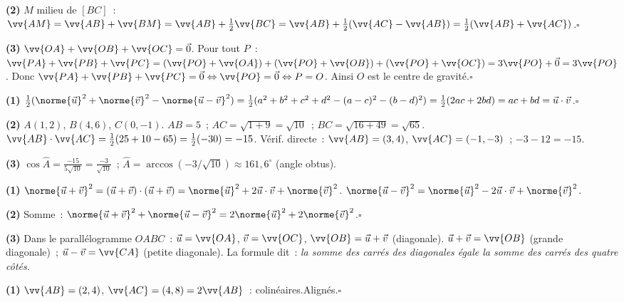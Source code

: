 \textbf{(2)} $M$ milieu de $[BC]$~: $\vv{AM}=\vv{AB}+\vv{BM}=\vv{AB}+\frac{1}{2}\vv{BC}
=\vv{AB}+\frac{1}{2}(\vv{AC}-\vv{AB})=\frac{1}{2}(\vv{AB}+\vv{AC})$.\hfill$\square$

\textbf{(3)} $\vv{OA}+\vv{OB}+\vv{OC}=\vec{0}$. Pour tout $P$~:
$\vv{PA}+\vv{PB}+\vv{PC}=(\vv{PO}+\vv{OA})+(\vv{PO}+\vv{OB})+(\vv{PO}+\vv{OC})
=3\vv{PO}+\vec{0}=3\vv{PO}$.
Donc $\vv{PA}+\vv{PB}+\vv{PC}=\vec{0}\Leftrightarrow\vv{PO}=\vec{0}\Leftrightarrow P=O$.
Ainsi $O$ est le centre de gravité.\hfill$\square$


\textbf{(1)} $\frac{1}{2}(\norme{\vec{u}}^2+\norme{\vec{v}}^2-\norme{\vec{u}-\vec{v}}^2)
=\frac{1}{2}(a^2+b^2+c^2+d^2-(a-c)^2-(b-d)^2)
=\frac{1}{2}(2ac+2bd)=ac+bd=\vec{u}\cdot\vec{v}$.\hfill$\square$

\textbf{(2)} $A(1,2)$, $B(4,6)$, $C(0,-1)$.
$AB=5$~; $AC=\sqrt{1+9}=\sqrt{10}$~; $BC=\sqrt{16+49}=\sqrt{65}$.
$\vv{AB}\cdot\vv{AC}=\frac{1}{2}(25+10-65)=\frac{1}{2}(-30)=-15$.
V\'erif. directe~: $\vv{AB}=(3,4)$, $\vv{AC}=(-1,-3)$~; $-3-12=-15$.\checkmark

\textbf{(3)} $\cos\hat{A}=\frac{-15}{5\sqrt{10}}=\frac{-3}{\sqrt{10}}$~;
$\hat{A}=\arccos(-3/\sqrt{10})\approx161{,}6^{\circ}$ (angle obtus).


\textbf{(1)} $\norme{\vec{u}+\vec{v}}^2=(\vec{u}+\vec{v})\cdot(\vec{u}+\vec{v})
=\norme{\vec{u}}^2+2\vec{u}\cdot\vec{v}+\norme{\vec{v}}^2$.
$\norme{\vec{u}-\vec{v}}^2=\norme{\vec{u}}^2-2\vec{u}\cdot\vec{v}+\norme{\vec{v}}^2$.

\textbf{(2)} Somme~: $\norme{\vec{u}+\vec{v}}^2+\norme{\vec{u}-\vec{v}}^2
=2\norme{\vec{u}}^2+2\norme{\vec{v}}^2$.\hfill$\square$

\textbf{(3)} Dans le parall\'elogramme $OABC$~:
$\vec{u}=\vv{OA}$, $\vec{v}=\vv{OC}$, $\vv{OB}=\vec{u}+\vec{v}$ (diagonale).
$\vec{u}+\vec{v}=\vv{OB}$ (grande diagonale)~;
$\vec{u}-\vec{v}=\vv{CA}$ (petite diagonale).
La formule dit~: \emph{la somme des carr\'es des diagonales
\'egale la somme des carr\'es des quatre c\^ot\'es.}


\textbf{(1)} $\vv{AB}=(2,4)$, $\vv{AC}=(4,8)=2\vv{AB}$~: colin\'eaires.\checkmark\quad Align\'es.\hfill$\square$

